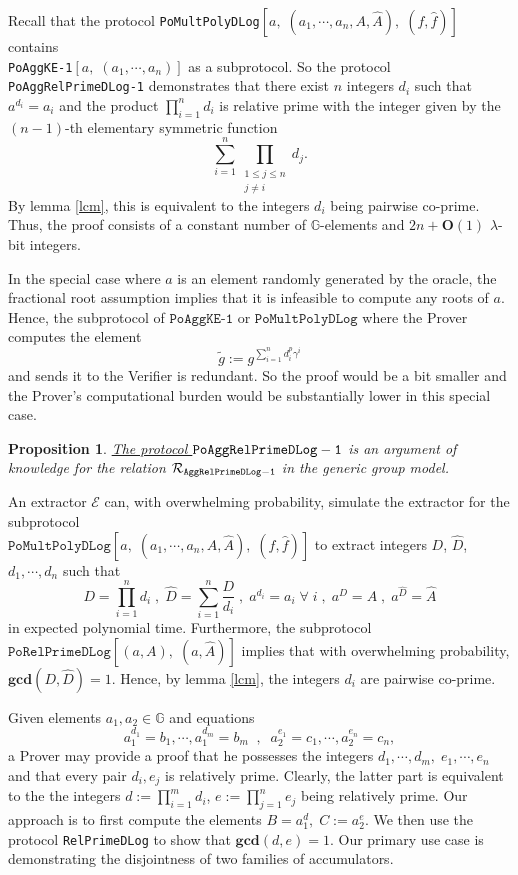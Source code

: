 \documentclass[11pt, lettersize, notitlepage, leqno, footskip=0.6cm]{article}
\newcommand{\pl}{\prod\limits}
\newcommand{\slim}{\sum\limits}
\newcommand{\ttt}{\texttt}
\newcommand{\wti}{\widetilde}
\newcommand{\mc}{\mathcal}
\newcommand{\mb}{\mathbb}
\newcommand{\mbf}{\mathbf}
\newcommand{\lam}{\lambda}
\newcommand{\what}{\widehat}
\newcommand{\bO}{\mbf{O}}
\newcommand{\vs}{\vspace{-0.15cm}}
\newcommand{\noin}{\noindent}
\newcommand{\op}{overwhelming probability}
\newcommand{\GCD}{\mbf{gcd}}
\newcommand{\E}{\mc{E}}
\newtheorem{Prop}[Thm]{Proposition}
\numberwithin{equation}{section}
\begin{document}
Recall that the protocol \verb|PoMultPolyDLog|$[a,\;(a_1,\cdots,a_n,A, \what{A}),\; (f,\what{f})]$  contains\\ \verb|PoAggKE-1|$[a,\;(a_1,\cdots,a_n)]$ as a subprotocol. So the protocol \verb|PoAggRelPrimeDLog-1| demonstrates that there exist $n$ integers $d_i$ such that $a^{d_i} = a_i$ and the product $\prod_{i=1}^n d_i$ is relative prime with the integer given by the $(n-1)$-th elementary symmetric function \vs $$\slim_{i=1}^n \pl_{\substack{1\leq j\leq n \\ j\neq i}} d_j. $$ By lemma \ref{lcm}, this is equivalent to the integers $d_i$ being pairwise co-prime. Thus, the proof consists of a constant number of $\mb{G}$-elements and $2n+\bO(1)$ $\lam$-bit integers. 

In the special case where $a$ is an element randomly generated by the oracle, the fractional root assumption implies that it is infeasible to compute any roots of $a$. Hence, the subprotocol of $\ttt{PoAggKE-1}$ or $\ttt{PoMultPolyDLog}$ where the Prover computes the element \vs $$\wti{g}:= g^{\slim_{i=1}^n d_i^{p}\gamma^i}$$ and sends it to the Verifier is redundant. So the proof would be a bit smaller and the Prover's computational burden would be substantially lower in this special case. \vspace{0.2cm}

\begin{Prop} \hyperlink{RP1}{The protocol $\tt{PoAggRelPrimeDLog}-1$} is an argument of knowledge for the relation $\mc{R}_{\tt{AggRelPrimeDLog-1}}$ in the generic group model.\end{Prop}

\begin{prf} An extractor $\E$ can, with \op, simulate the extractor for the subprotocol\\ $\ttt{PoMultPolyDLog}[a,\;(a_1,\cdots,a_n,A, \what{A}),\; (f,\what{f})]$ to extract integers $D$, $\what{D}$, $d_1,\cdots,d_n$ such that \vs $$D = \pl_{i=1}^n d_i\;,\;\what{D} = \slim_{i=1}^n \frac{D}{d_i}   \;,\;a^{d_i} = a_i\;\forall\;i \;,\;a^{D} = A\;,\; a^{\what{D}} = \what{A} $$ in expected polynomial time. Furthermore, the subprotocol $\ttt{PoRelPrimeDLog}[(a,A),\;(a,\what{A})]$ implies that with \op, $\GCD(D,\what{D}) = 1$. Hence, by lemma \ref{lcm}, the integers $d_i$ are pairwise co-prime.\end{prf}



\bigskip

\noin Given elements $a_1, a_2\in \mb{G}$ and equations \vs $$a_1^{d_1} = b_1,\cdots, a_1^{d_m}= b_m\;\;,\;\; a_2^{e_1} = c_1,\cdots, a_2^{e_n} = c_n,$$ a Prover may provide a proof that he possesses the integers $d_1,\cdots, d_m,\;e_1,\cdots, e_n$ and that every pair $d_i, e_j$ is relatively prime. Clearly, the latter part is equivalent to the the integers $d:=\prod_{i=1}^m d_i$, $e:=\prod_{j=1}^n e_j$ being relatively prime. Our approach is to first compute the elements $B = a_1^d,\;C:= a_2^{e}$. We then  use the protocol \verb|RelPrimeDLog| to show that $\GCD(d, e) = 1$. Our primary use case is demonstrating the disjointness of two families of accumulators.
\end{document}

